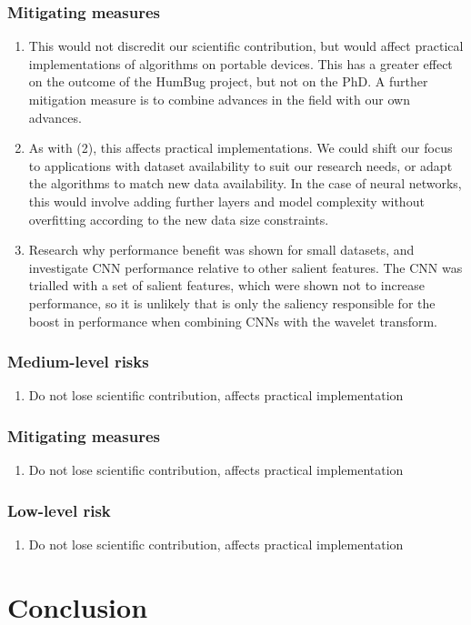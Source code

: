 \documentclass[12pt]{llncs}
\begin{document}
\subsubsection{Mitigating measures}
\begin{enumerate}
	\item This would not discredit our scientific contribution, but would affect practical implementations of algorithms on portable devices. This has a greater effect on the outcome of the HumBug project, but not on the PhD. A further mitigation measure is to combine advances in the field with our own advances.
	\item As with (2), this affects practical implementations. We could shift our focus to applications with dataset availability to suit our research needs, or adapt the algorithms to match new data availability. In the case of neural networks, this would involve adding further layers and model complexity without overfitting according to the new data size constraints.
	\item Research why performance benefit was shown for small datasets, and investigate CNN performance relative to other salient features. The CNN was trialled with a set of salient features, which were shown not to increase performance, so it is unlikely that is only the saliency responsible for the boost in performance when combining CNNs with the wavelet transform.
\end{enumerate}

\subsubsection{Medium-level risks} 
\begin{enumerate}
	\item Do not lose scientific contribution, affects practical implementation
\end{enumerate}
\subsubsection{Mitigating measures}
\begin{enumerate}
	\item Do not lose scientific contribution, affects practical implementation
\end{enumerate}
\subsubsection{Low-level risk} 
\begin{enumerate}
	\item Do not lose scientific contribution, affects practical implementation
\end{enumerate}

\section{Conclusion}
\label{sec:conclusion}




\end{document}
